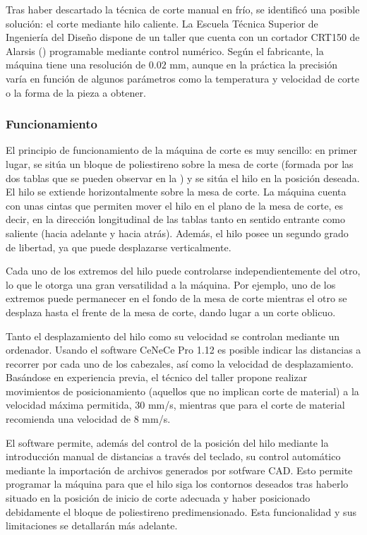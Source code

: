 Tras haber descartado la técnica de corte manual en frío, se identificó una posible solución: el corte mediante hilo caliente. La Escuela Técnica Superior de Ingeniería del Diseño dispone de un taller que cuenta con un cortador CRT150 de Alarsis () programable mediante control numérico. Según el fabricante\cite{ref:crt150}, la máquina tiene una resolución de $0.02$ mm, aunque en la práctica la precisión varía en función de algunos parámetros como la temperatura y velocidad de corte o la forma de la pieza a obtener.

\subsubsection{Funcionamiento}
\label{sec:building:technique:functioning}

El principio de funcionamiento de la máquina de corte es muy sencillo: en primer lugar, se sitúa un bloque de poliestireno sobre la mesa de corte (formada por las dos tablas que se pueden observar en la ) y se sitúa el hilo en la posición deseada. El hilo se extiende horizontalmente sobre la mesa de corte. La máquina cuenta con unas cintas que permiten mover el hilo en el plano de la mesa de corte, es decir, en la dirección longitudinal de las tablas tanto en sentido entrante como saliente (hacia adelante y hacia atrás). Además, el hilo posee un segundo grado de libertad, ya que puede desplazarse verticalmente.

Cada uno de los extremos del hilo puede controlarse independientemente del otro, lo que le otorga una gran versatilidad a la máquina. Por ejemplo, uno de los extremos puede permanecer en el fondo de la mesa de corte mientras el otro se desplaza hasta el frente de la mesa de corte, dando lugar a un corte oblicuo.

Tanto el desplazamiento del hilo como su velocidad se controlan mediante un ordenador. Usando el software CeNeCe Pro 1.12 es posible indicar las distancias a recorrer por cada uno de los cabezales, así como la velocidad de desplazamiento. Basándose en experiencia previa, el técnico del taller propone realizar movimientos de posicionamiento (aquellos que no implican corte de material) a la velocidad máxima permitida, 30 mm/s, mientras que para el corte de material recomienda una velocidad de 8 mm/s.

El software permite, además del control de la posición del hilo mediante la introducción manual de distancias a través del teclado, su control automático mediante la importación de archivos generados por sotfware CAD. Esto permite programar la máquina para que el hilo siga los contornos deseados tras haberlo situado en la posición de inicio de corte adecuada y haber posicionado debidamente el bloque de poliestireno predimensionado. Esta funcionalidad y sus limitaciones se detallarán más adelante.

